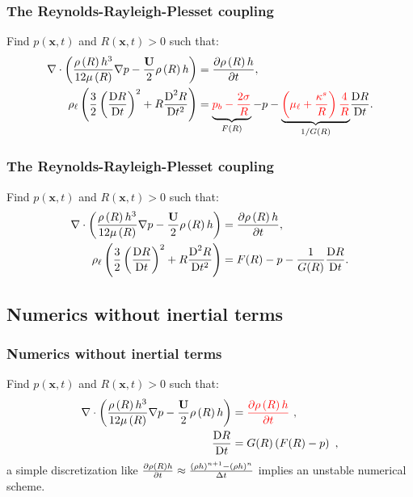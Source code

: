 \documentclass[10pt,aspectratio=169]{beamer}
\begin{document}
\begin{frame}[noframenumbering]
\frametitle{The Reynolds-Rayleigh-Plesset coupling}

Find $p(\mathbf{x},t)$ and $R(\mathbf{x},t)>0$ such that:
\begin{align*}
\nabla\cdot\left(\frac{\rho\left(R\right) h^3}{12\mu\left(R\right) }\nabla p -\frac{\mathbf{U}}{2}\rho\left(R\right) h \right)&=\frac{\partial \rho\left(R\right) h}{\partial t},\\
\rho_\ell\left(\frac{3}{2}\left(\frac{\mbox{D} R}{\mbox{D} t}\right)^2+R\frac{\mbox{D}^2 R}{\mbox{D} {t}^2}\right)&=\underbrace{{\color{red}p_b-\frac{2\sigma}{R}}}_{F(R)}-p-{\underbrace{\color{red}\left(\mu_\ell+\frac{\kappa^s}{R}\right)\frac{4}{R}}_{1/G(R)}}\frac{\mbox{D} R}{\mbox{D} t}.
\end{align*}
\end{frame} 

\begin{frame}[noframenumbering]
\frametitle{The Reynolds-Rayleigh-Plesset coupling}

Find $p(\mathbf{x},t)$ and $R(\mathbf{x},t)>0$ such that:
\begin{align*}
\nabla\cdot\left(\frac{\rho\left(R\right) h^3}{12\mu\left(R\right) }\nabla p -\frac{\mathbf{U}}{2}\rho\left(R\right) h \right)&=\frac{\partial \rho\left(R\right) h}{\partial t},\\
\rho_\ell\left(\frac{3}{2}\left(\frac{\mbox{D} R}{\mbox{D} t}\right)^2+R\frac{\mbox{D}^2 R}{\mbox{D} {t}^2}\right)&=F(R)-p-\frac{1}{G(R)}\frac{\mbox{D} R}{\mbox{D} t}.
\end{align*}
\end{frame} 

\subsection{Numerics without inertial terms}
\setcounter{showSlideNumbers}{0}
\begin{frame}[noframenumbering]
\tableofcontents[
currentsection,
currentsubsection,
subsectionstyle=show/shaded/hide
]
\end{frame}
\setcounter{showSlideNumbers}{1}


\begin{frame}\frametitle{Numerics without inertial terms}
Find $p(\mathbf{x},t)$ and $R(\mathbf{x},t)>0$ such that:
\begin{align*}
\nabla\cdot\left(\frac{\rho\left(R\right) h^3}{12\mu\left(R\right) }\nabla p -\frac{\mathbf{U}}{2}\rho\left(R\right) h \right)&={\color{red}\frac{\partial \rho\left(R\right) h}{\partial t}}~,\\
\frac{\mbox{D} R}{\mbox{D} t}&=G(R)\left(F(R)-p\right)~,
\end{align*}
a simple discretization like $\frac{\partial \rho\left(R\right) h}{\partial t}\approx \frac{(\rho h)^{n+1}-(\rho h)^{n}}{\Delta t}$ implies an unstable numerical scheme.
\end{frame}
\end{document}
